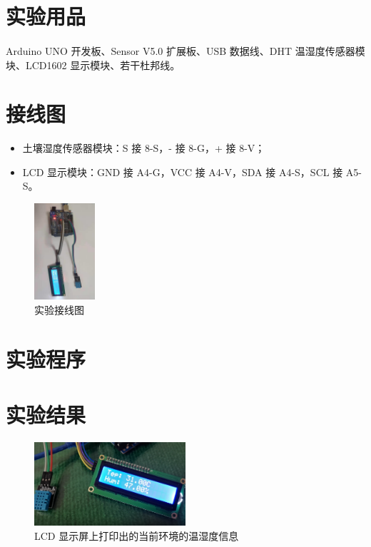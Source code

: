 \documentclass[UTF8, oneside]{ctexbook}
\begin{document}
\section{实验用品}
\paragraph{}
Arduino UNO 开发板、Sensor V5.0 扩展板、USB 数据线、DHT 温湿度传感器模块、LCD1602 显示模块、若干杜邦线。

\section{接线图}
\begin{itemize}
    \item 土壤湿度传感器模块：S 接 8-S，- 接 8-G，+ 接 8-V；
    \item LCD 显示模块：GND 接 A4-G，VCC 接 A4-V，SDA 接 A4-S，SCL 接 A5-S。
\end{itemize}
\begin{figure}[h]
    \centering
    \includegraphics[width=0.2\textwidth]{./result/sensor/11/lines2.png}
    \caption{实验接线图}
    \label{s11_line}
\end{figure}

\section{实验程序}


\section{实验结果}

\begin{figure}[h]
    \centering
    \includegraphics[width=0.5\textwidth]{./result/sensor/11/result.png}
    \caption{LCD 显示屏上打印出的当前环境的温湿度信息}
    \label{s22_1}
\end{figure}
\end{document}
